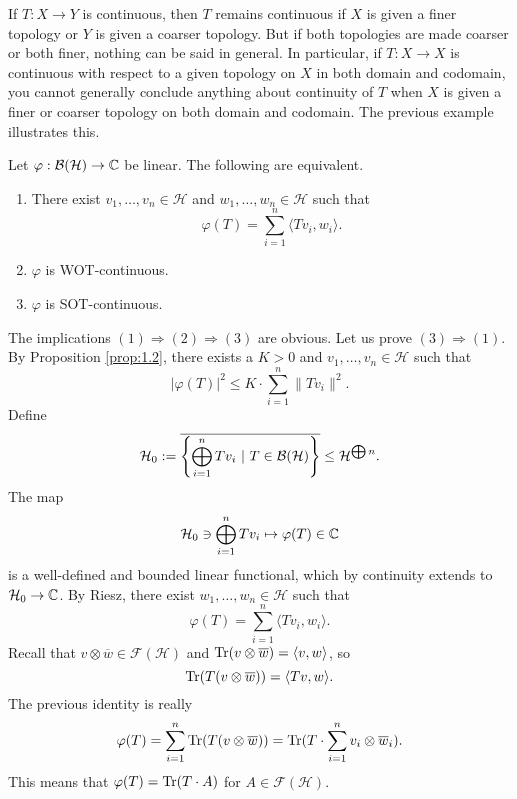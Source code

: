 \begin{remark}
  If $T:X\to Y$ is continuous, then $T$ remains continuous if $X$ is given a finer topology or $Y$ is given a coarser topology. 
  But if both topologies are made coarser or both finer, nothing can be said in general. In particular, if $T:X\to X$ is 
  continuous with respect to a given topology on $X$ in both domain and codomain, you cannot generally conclude anything 
  about continuity of $T$ when $X$ is given a finer or coarser topology on both domain and codomain. The previous example illustrates this.
\end{remark}

\begin{lemma}
  Let $\varphi: \operatorname{\mathcal{B} (\mathcal{H})} \to \mathbb {C}$ be linear. The following are equivalent.
  \begin{enumerate}
    \item There exist $v_1, \dots, v_n \in \mathcal{H}$ and $w_1, \dots, w_n \in \mathcal{H}$ such that 
    $$\varphi (T) = \sum_{i = 1} ^n \langle T v_i, w_i \rangle.$$
    \item $\varphi$ is WOT-continuous.
    \item $\varphi$ is SOT-continuous.
  \end{enumerate}
\end{lemma}

\begin{myproof}
  The implications $(1) \Rightarrow (2) \Rightarrow (3)$ are obvious. Let us prove $(3) \Rightarrow (1)$.
  By Proposition \ref{prop:1.2}, there exists a $K > 0$ and $v_1, \dots, v_n \in \mathcal{H}$
  such that 
  $$|\varphi(T)|^2 \leq K \cdot \sum_{i = 1} ^n \| Tv_i\|^2.$$
  Define $$\mathcal{H}_0 := \overline{\left\lbrace \bigoplus_{i = 1} ^n Tv_i\ |\ T \in \operatorname{\mathcal{B} (\mathcal{H})} \right\rbrace} \leq \mathcal{H} ^{\bigoplus n}.$$
  The map 
  $$\mathcal{H}_0 \ni \bigoplus_{i = 1} ^n T v_i \mapsto \varphi(T) \in \mathbb {C}$$
  is a well-defined and bounded linear functional, which by continuity extends to $\mathcal{H}_0 \to \mathbb {C}$.
  By Riesz, there exist $w_1, \dots, w_n \in \mathcal{H}$ such that 
  $$\varphi(T) = \sum_{i = 1} ^n \langle T v_i, w_i \rangle.$$
  Recall that $v \otimes \overline{w} \in \mathcal{F} (\mathcal{H})$ and $\operatorname{Tr} (v \otimes \overline{w}) = \langle v, w \rangle$, so 
  $$\operatorname{Tr} (T (v \otimes \overline{w})) = \langle Tv, w \rangle.$$
  The previous identity is really 
  $$\varphi(T) = \sum_{i = 1} ^n \operatorname{Tr} (T (v \otimes \overline{w})) = \operatorname{Tr} (T \cdot \sum_{i = 1} ^n v_i \otimes \overline{w}_i).$$
  This means that $\varphi(T) = \operatorname{Tr} (T \cdot A)$ for $A \in \mathcal{F} (\mathcal{H})$.
\end{myproof}

